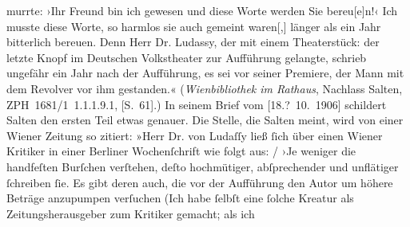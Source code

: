 \begin{ledgroupsized}[t]{13cm}
{{{                     murrte: ›Ihr Freund bin ich gewesen und diese Worte werden Sie
                        bereu{[}e{]}n!‹ Ich musste diese Worte, so harmlos sie auch
                     gemeint waren{[},{]} länger als ein Jahr bitterlich bereuen.
                     Denn Herr Dr. Ludassy, der mit einem
                     Theaterstück: der letzte Knopf im Deutschen Volkstheater zur Aufführung
                     gelangte, schrieb ungefähr ein Jahr nach der Aufführung, es sei vor seiner
                     Premiere, der Mann mit dem Revolver vor ihm gestanden.« (\emph{Wienbibliothek im Rathaus}, Nachlass Salten, ZPH 1681/1 1.1.1.9.1, [S. 61].) In seinem
                  Brief vom [18.? 10. 1906]
                  schildert Salten den ersten Teil etwas
                  genauer. Die Stelle, die Salten meint, wird
                  von einer Wiener Zeitung so zitiert: »Herr Dr. von Ludaſſy ließ ſich über
                        einen Wiener Kritiker in einer Berliner Wochenſchrift wie folgt aus:{ / }›Je weniger die handfeſten Burſchen verſtehen, deſto hochmütiger,
                        abſprechender und unflätiger ſchreiben ſie. Es gibt deren auch, die vor der
                        Aufführung den Autor um höhere Beträge anzupumpen verſuchen (Ich habe ſelbſt
                        eine ſolche Kreatur als Zeitungsherausgeber zum Kritiker gemacht; als ich
}}}
\end{ledgroupsized}

